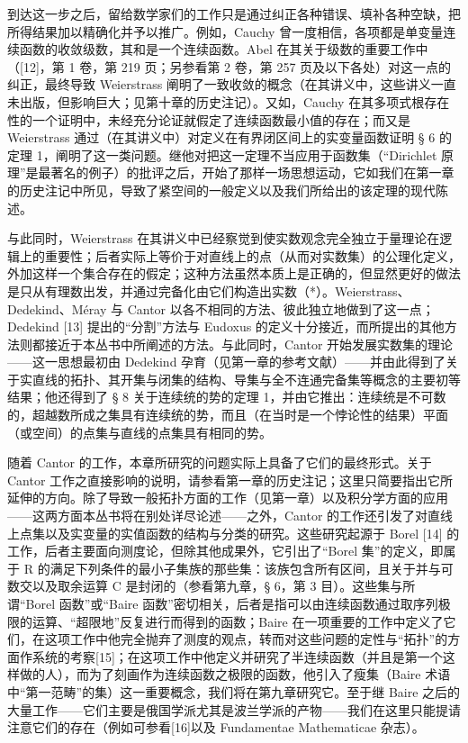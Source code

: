 到达这一步之后，留给数学家们的工作只是通过纠正各种错误、填补各种空缺，把所得结果加以精确化并予以推广。例如，Cauchy 曾一度相信，各项都是单变量连续函数的收敛级数，其和是一个连续函数。Abel 在其关于级数的重要工作中（{[}12{]}，第 1 卷，第 219 页；另参看第 2 卷，第 257 页及以下各处）对这一点的纠正，最终导致 Weierstrass 阐明了一致收敛的概念（在其讲义中，这些讲义一直未出版，但影响巨大；见第十章的历史注记）。又如，Cauchy 在其多项式根存在性的一个证明中，未经充分论证就假定了连续函数最小值的存在；而又是 Weierstrass 通过（在其讲义中）对定义在有界闭区间上的实变量函数证明 § 6 的定理 1，阐明了这一类问题。继他对把这一定理不当应用于函数集（“Dirichlet 原理”是最著名的例子）的批评之后，开始了那样一场思想运动，它如我们在第一章的历史注记中所见，导致了紧空间的一般定义以及我们所给出的该定理的现代陈述。

与此同时，Weierstrass 在其讲义中已经察觉到使实数观念完全独立于量理论在逻辑上的重要性；后者实际上等价于对直线上的点（从而对实数集）的公理化定义，外加这样一个集合存在的假定；这种方法虽然本质上是正确的，但显然更好的做法是只从有理数出发，并通过完备化由它们构造出实数（*）。Weierstrass、Dedekind、Méray 与 Cantor 以各不相同的方法、彼此独立地做到了这一点；Dedekind {[}13{]} 提出的“分割”方法与 Eudoxus 的定义十分接近，而所提出的其他方法则都接近于本丛书中所阐述的方法。与此同时，Cantor 开始发展实数集的理论——这一思想最初由 Dedekind 孕育（见第一章的参考文献）——并由此得到了关于实直线的拓扑、其开集与闭集的结构、导集与全不连通完备集等概念的主要初等结果；他还得到了 § 8 关于连续统的势的定理 1，并由它推出：连续统是不可数的，超越数所成之集具有连续统的势，而且（在当时是一个悖论性的结果）平面（或空间）的点集与直线的点集具有相同的势。

随着 Cantor 的工作，本章所研究的问题实际上具备了它们的最终形式。关于 Cantor 工作之直接影响的说明，请参看第一章的历史注记；这里只简要指出它所延伸的方向。除了导致一般拓扑方面的工作（见第一章）以及积分学方面的应用——这两方面本丛书将在别处详尽论述——之外，Cantor 的工作还引发了对直线上点集以及实变量的实值函数的结构与分类的研究。这些研究起源于 Borel {[}14{]} 的工作，后者主要面向测度论，但除其他成果外，它引出了“Borel 集”的定义，即属于 R 的满足下列条件的最小子集族的那些集：该族包含所有区间，且关于并与可数交以及取余运算 C 是封闭的（参看第九章，§ 6，第 3 目）。这些集与所谓“Borel 函数”或“Baire 函数”密切相关，后者是指可以由连续函数通过取序列极限的运算、“超限地”反复进行而得到的函数；Baire 在一项重要的工作中定义了它们，在这项工作中他完全抛弃了测度的观点，转而对这些问题的定性与“拓扑”的方面作系统的考察{[}15{]}；在这项工作中他定义并研究了半连续函数（并且是第一个这样做的人），而为了刻画作为连续函数之极限的函数，他引入了瘦集（Baire 术语中“第一范畴”的集）这一重要概念，我们将在第九章研究它。至于继 Baire 之后的大量工作——它们主要是俄国学派尤其是波兰学派的产物——我们在这里只能提请注意它们的存在（例如可参看{[}16{]}以及 Fundamentae Mathematicae 杂志）。

